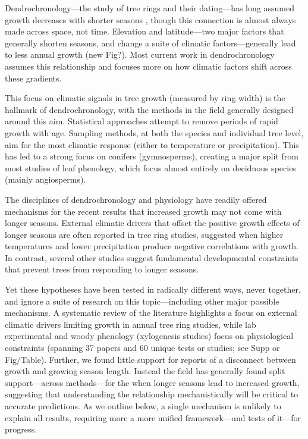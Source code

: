 \documentclass[11pt]{article}
\begin{document}
Dendrochronology---the study of tree rings and their dating---has long assumed growth decreases with shorter seasons \citep[e.g.,][]{bruening2017}, though this connection is almost always made across space, not time. Elevation and latitude---two major factors that generally shorten seasons, and change a suite of climatic factors---generally lead to less annual growth (new Fig?). Most current work in dendrochronology assumes this relationship and focuses more on how climatic factors shift across these gradients. 

This focus on climatic signals in tree growth (measured by ring width) is the hallmark of dendrochronology, with the methods in the field generally designed around this aim. Statistical approaches attempt to remove periods of rapid growth with age. Sampling methods, at both the species and individual tree level, aim for the most climatic response (either to temperature or precipitation). This has led to a strong focus on conifers (gymnosperms), creating a major split from most studies of leaf phenology, which focus almost entirely on deciduous species (mainly angiosperms).

The disciplines of dendrochronology and physiology have readily offered mechanisms for the recent results that increased growth may not come with longer seasons. External climatic drivers that offset the positive growth effects of longer seasons are often reported in tree ring studies, suggested when higher temperatures and lower precipitation produce negative correlations with growth. In contrast, several other studies suggest fundamental developmental constraints that prevent trees from responding to longer seasons. 

Yet these hypotheses have been tested in radically different ways, never together, and ignore a suite of research on this topic---including other major possible mechanisms. A systematic review of the literature highlights a focus on external climatic drivers limiting growth in annual tree ring studies, while lab experimental and woody phenology (xylogenesis studies) focus on physiological constraints (spanning 37 papers and 60 unique tests or studies; see Supp or Fig/Table). Further, we found little support for reports of a disconnect between growth and growing season length. Instead the field has generally found split support---across methods---for the when longer seasons lead to increased growth, suggesting that understanding the relationship mechanistically will be critical to accurate predictions. As we outline below, a single mechanism is unlikely to explain all results, requiring more a more unified framework---and tests of it---for progress. 
\end{document}
